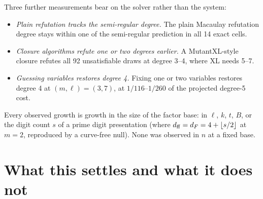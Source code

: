 Three further measurements bear on the solver rather than the system:
\begin{itemize}
\item \emph{Plain refutation tracks the semi-regular degree.} The plain
  Macaulay refutation degree stays within one of the semi-regular
  prediction in all 14 exact cells.
\item \emph{Closure algorithms refute one or two degrees earlier.} A
  MutantXL-style closure refutes all 92 unsatisfiable draws at degree 3--4,
  where XL needs 5--7.
\item \emph{Guessing variables restores degree 4.} Fixing one or two
  variables restores degree 4 at $(m,\ell)=(3,7)$, at $1/116$--$1/260$ of
  the projected degree-5 cost.
\end{itemize}
Every observed growth is growth in the size of the factor base: in $\ell$,
$k$, $t$, $B$, or the digit count $s$ of a prime digit presentation (where
$d_{\rm ff}=d_F=4+\lfloor s/2\rfloor$ at $m=2$, reproduced by a curve-free
null). None was observed in $n$ at a fixed base.

\section{What this settles and what it does not}\label{sec:fd-summary}

